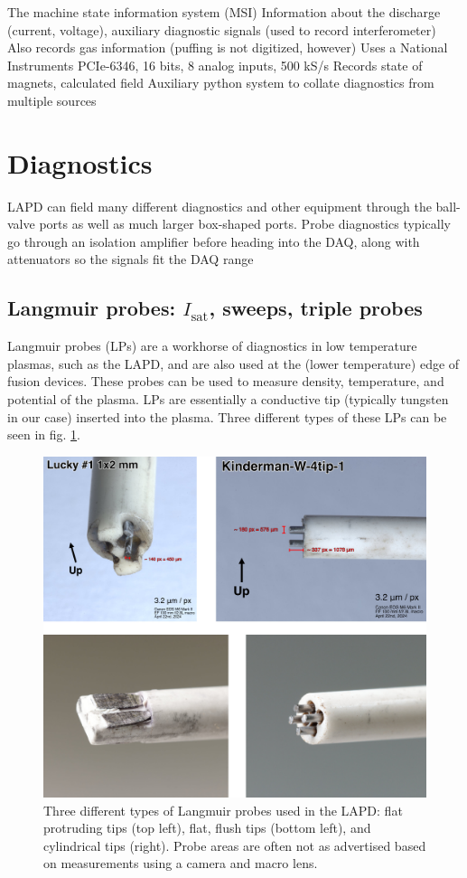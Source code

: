 The machine state information system (MSI)
Information about the discharge (current, voltage), auxiliary diagnostic signals (used to record interferometer)
Also records gas information (puffing is not digitized, however)
Uses a National Instruments PCIe-6346, 16 bits, 8 analog inputs, 500 kS/s
Records state of magnets, calculated field
Auxiliary python system to collate diagnostics from multiple sources


\section{Diagnostics}

LAPD can field many different diagnostics and other equipment through the ball-valve ports as well as much larger box-shaped ports.
Probe diagnostics typically go through an isolation amplifier before heading into the DAQ, along with attenuators so the signals fit the DAQ range

\subsection{Langmuir probes: $I_\text{sat}$, sweeps, triple probes}

Langmuir probes (LPs) are a workhorse of diagnostics in low temperature plasmas, such as the LAPD, and are also used at the (lower temperature) edge of fusion devices. These probes can be used to measure density, temperature, and potential of the plasma. LPs are essentially a conductive tip (typically tungsten in our case) inserted into the plasma. Three different types of these LPs can be seen in fig. \ref{fig:langmuir_tips}. 

\begin{figure}
	\centering
	\includegraphics[width=\textwidth]{figures/langmuir_pics.jpg}
	\caption[Images of Langmuir probes used in the LAPD]{\label{fig:langmuir_tips}Three different types of Langmuir probes used in the LAPD: flat protruding tips (top left), flat, flush tips (bottom left), and cylindrical tips (right). Probe areas are often not as advertised based on measurements using a camera and macro lens.}
\end{figure}

